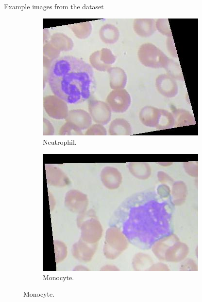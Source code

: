 \documentclass[15pt]{beamer}
\begin{document}
{


{
\begin{frame}{Example images from the dataset}
\begin{figure}
  \begin{subfigure}[t]{.4\textwidth}
    \centering
    \includegraphics[width=\linewidth]{neutrophil.jpeg}
    \caption{Neutrophil.}
  \end{subfigure}
  \hfill
  \begin{subfigure}[t]{.4\textwidth}
    \centering
    \includegraphics[width=\linewidth]{monocyte.jpeg}
    \caption{Monocyte.}
  \end{subfigure}

  \medskip


\end{figure}
\end{frame}}}
\end{document}
